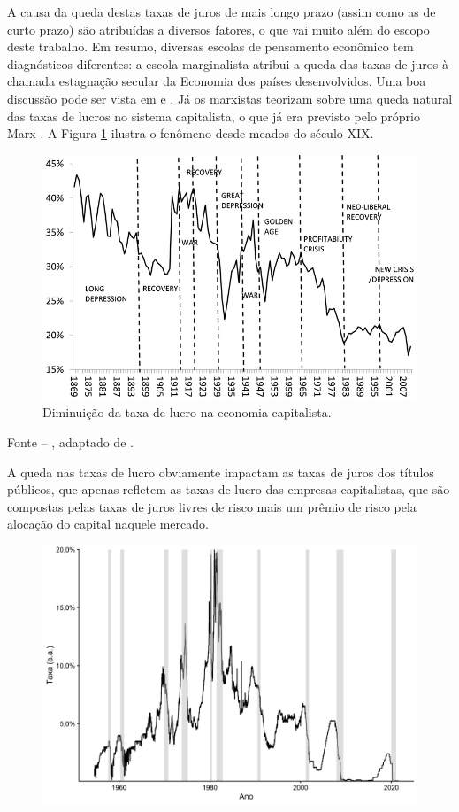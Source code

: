 \documentclass[
	12pt,				%
	oneside,			%
	a4paper,			%
	chapter=TITLE,		%
	section=TITLE,		%
	english,			%
	brazil				%
	]{abntex2}
\newcommand{\bcenter}{\begin{center}}
\newcommand{\ecenter}{\end{center}}
\begin{document}
\begin{refsection}
A causa da queda destas taxas de juros de mais longo prazo (assim como as de
curto prazo) são atribuídas a diversos fatores, o que vai muito além do escopo
deste trabalho. Em resumo, diversas escolas de pensamento econômico tem
diagnósticos diferentes: a escola marginalista atribui a queda das taxas de
juros à chamada estagnação secular da Economia dos países desenvolvidos. Uma boa
discussão pode ser vista em \textcite{bresser2018} e \textcite{krugman2020}. Já os marxistas
teorizam sobre uma queda natural das taxas de lucros no sistema capitalista,
o que já era previsto pelo próprio Marx \autocite{roberts2020}. A Figura \ref{fig:roberts}
ilustra o fenômeno desde meados do século XIX.
\begin{figure}[H]

{\centering \includegraphics[width=1\linewidth]{images/wrp-2} 

}

\caption{Diminuição da taxa de lucro na economia capitalista.}\label{fig:roberts}
\end{figure}
\bcenter

\small Fonte -- \textcite{roberts2020}, adaptado de \textcite{crisis}.
\ecenter

A queda nas taxas de lucro obviamente impactam as taxas de juros dos títulos
públicos, que apenas refletem as taxas de lucro das empresas capitalistas, que
são compostas pelas taxas de juros livres de risco mais um prêmio de risco pela
alocação do capital naquele mercado.
\begin{figure}[H]

{\centering \includegraphics[width=0.7\linewidth]{images/effr-1} 

}
\end{figure}
\end{refsection}
\end{document}
